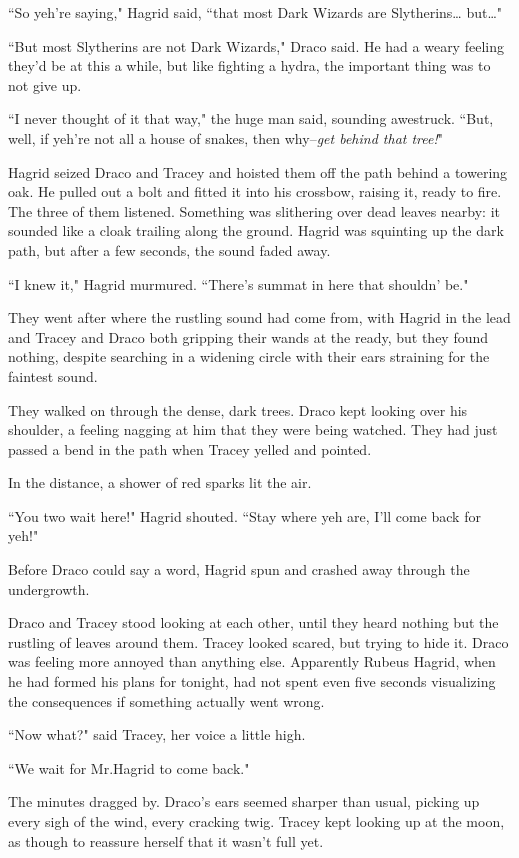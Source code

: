 ``So yeh're saying," Hagrid said, ``that most Dark Wizards are Slytherins{\ldots} but{\ldots}"

``But most Slytherins are not Dark Wizards," Draco said. He had a weary feeling they'd be at this a while, but like fighting a hydra, the important thing was to not give up.

``I never thought of it that way," the huge man said, sounding awestruck. ``But, well, if yeh're not all a house of snakes, then why\---\emph{get behind that tree!}"

Hagrid seized Draco and Tracey and hoisted them off the path behind a towering oak. He pulled out a bolt and fitted it into his crossbow, raising it, ready to fire. The three of them listened. Something was slithering over dead leaves nearby: it sounded like a cloak trailing along the ground. Hagrid was squinting up the dark path, but after a few seconds, the sound faded away.

``I knew it," Hagrid murmured. ``There's summat in here that shouldn' be."

They went after where the rustling sound had come from, with Hagrid in the lead and Tracey and Draco both gripping their wands at the ready, but they found nothing, despite searching in a widening circle with their ears straining for the faintest sound.

They walked on through the dense, dark trees. Draco kept looking over his shoulder, a feeling nagging at him that they were being watched. They had just passed a bend in the path when Tracey yelled and pointed.

In the distance, a shower of red sparks lit the air.

``You two wait here!" Hagrid shouted. ``Stay where yeh are, I'll come back for yeh!"

Before Draco could say a word, Hagrid spun and crashed away through the undergrowth.

Draco and Tracey stood looking at each other, until they heard nothing but the rustling of leaves around them. Tracey looked scared, but trying to hide it. Draco was feeling more annoyed than anything else. Apparently Rubeus Hagrid, when he had formed his plans for tonight, had not spent even five seconds visualizing the consequences if something actually went wrong.

``Now what?" said Tracey, her voice a little high.

``We wait for Mr.\?Hagrid to come back."

The minutes dragged by. Draco's ears seemed sharper than usual, picking up every sigh of the wind, every cracking twig. Tracey kept looking up at the moon, as though to reassure herself that it wasn't full yet.

